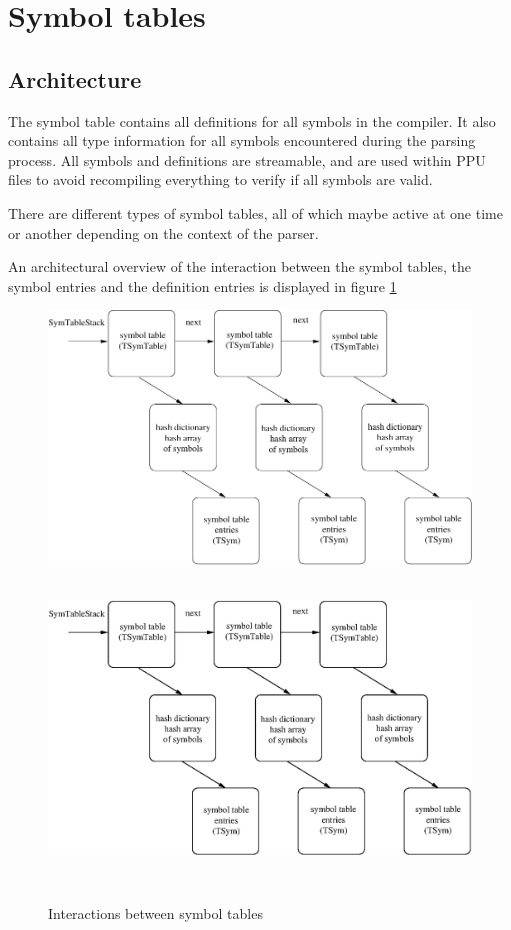 \documentclass [a4paper,12pt]{article}
\begin{document}
\section{Symbol tables}
\label{sec:symbol}

\subsection{Architecture}
\label{subsec:architecturesructord}

The symbol table contains all definitions for all symbols in the compiler.
It also contains all type information for all symbols encountered during the 
parsing process. All symbols and definitions are streamable, and are used 
within PPU files to avoid recompiling everything to verify if all symbols are valid.

There are different types of symbol tables, all of which maybe active at one
time or another depending on the context of the parser.

An architectural overview of the interaction between the symbol tables, the
symbol entries and the definition entries is displayed in figure \ref{fig4}

\begin{figure}
\ifpdf
\includegraphics{arch4.pdf}
\else
\includegraphics[width=6.29in,height=3.29in]{arch4.eps}
\fi
\label{fig4}
\caption{Interactions between symbol tables}
\end{figure}
\end{document}
